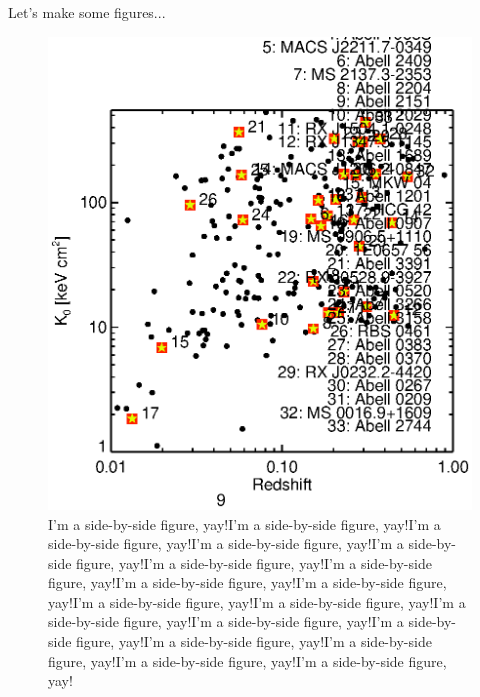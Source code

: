 \documentclass[letterpaper,11pt,onecolumn]{article}
\begin{document}
Let's make some figures...

\begin{figure}[ht]
    \begin{minipage}[b]{0.5\linewidth}
        \centering
        \includegraphics*[scale=0.75, trim=30mm 15mm 30mm 15mm, clip]{new_obs_k0z}
        \caption{I'm a side-by-side figure, yay!I'm a side-by-side
figure, yay!I'm a side-by-side figure, yay!I'm a side-by-side figure,
yay!I'm a side-by-side figure, yay!I'm a side-by-side figure, yay!I'm
a side-by-side figure, yay!I'm a side-by-side figure, yay!I'm a
side-by-side figure, yay!I'm a side-by-side figure, yay!I'm a
side-by-side figure, yay!I'm a side-by-side figure, yay!I'm a
side-by-side figure, yay!I'm a side-by-side figure, yay!I'm a
side-by-side figure, yay!I'm a side-by-side figure, yay!I'm a
side-by-side figure, yay!I'm a side-by-side figure, yay!}
        \label{fig:figure1}
    \end{minipage}           %

\end{figure}
\end{document}
